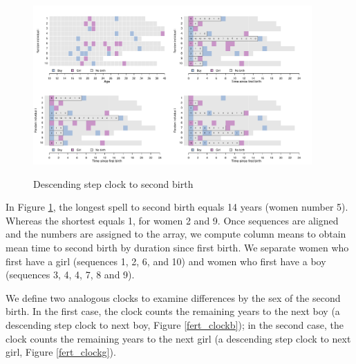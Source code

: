 \documentclass[a4paper,left=1.25cm,right=1.25cm,top=1.25cm,bottom=1.25cm]{article}
\begin{document}
\begin{figure}[H]
\centering
    \includegraphics[trim=17cm 10cm 1cm 1cm, clip, width=0.95\textwidth]{Spells/Figures/colombia/illu_fertility.pdf}\\
    \caption{Descending step clock to second birth}
    \label{fert_aling}
\end{figure}

In Figure \ref{fert_aling}, the longest spell to second birth equals 14 years (women number 5). Whereas the shortest equals 1, for women 2 and 9. Once sequences are aligned and the numbers are assigned to the array, we compute column means to obtain mean time to second birth by duration since first birth. We separate women who first have a girl (sequences 1, 2, 6, and 10) and women who first have a boy (sequences 3, 4, 4, 7, 8 and 9).

We define two analogous clocks to examine differences by the sex of the second birth. In the first case, the clock counts the remaining years to the next boy (a descending step clock to next boy, Figure \ref{fert_clockb}); in the second case, the clock counts the remaining years to the next girl (a descending step clock to next girl, Figure \ref{fert_clockg}). 
\end{document}

